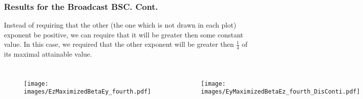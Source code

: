 \documentclass[mathserif]{beamer}
\begin{document}
\begin{frame}
\frametitle{Results for the Broadcast BSC. Cont.}
\begin{block}{}
    Instead of requiring that the other (the one which is not drawn in each plot) exponent be positive, we can require that it will be greater then some constant value. In this case, we required that the other exponent will be greater then $\frac 1 4$ of its maximal attainable value.
\end{block}
\begin{columns}[c] %


\begin{figure}[htp]
\centering
\texttt{[image: images/EzMaximizedBetaEy\_fourth.pdf]}
\end{figure}

\begin{figure}[htp]
\texttt{[image: images/EyMaximizedBetaEz\_fourth\_DisConti.pdf]}
\end{figure}

\end{columns}
\end{frame}
\end{document}
